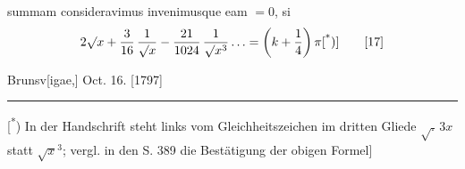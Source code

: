 \noindent summam consideravimus invenimusque eam \(=0\), si
\begin{equation}
2\surd x+\frac3{16}\,\frac1{\surd x}-\frac{21}{1024}\,\frac1{\surd x^3}\,{.}\,{.}\,{.}=\left(k+\frac14\right)\pi\text{[\textsuperscript{*})]}\tag*{[17]}
\end{equation}
\begin{flushright}Brunsv[igae,] Oct. 16. [1797]\end{flushright}
\par\medskip\noindent\rule{.24\linewidth}{.4pt}\par\smallskip
{\small\noindent\hspace*{\parindent}[\textsuperscript{*}) In der Handschrift steht links vom Gleichheitszeichen im dritten Gliede \(\surd{.}\,3x\) statt \(\surd x^3\); vergl. in den  S. 389 die Bestätigung der obigen Formel]\par}
\par\endgroup{}
